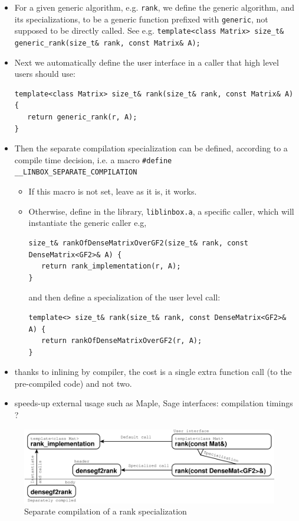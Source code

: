 \documentclass[runningheads,a4paper]{llncs}
\begin{document}
\begin{itemize}
\item For a given generic algorithm, e.g. \verb!rank!, we define the
  generic algorithm, and its specializations, to be a generic function
  prefixed with \verb!generic!, not supposed to be directly called. See e.g. 
\verb!template<class Matrix> size_t& generic_rank(size_t& rank, const Matrix& A);!
\item Next we automatically define the user interface in a caller that
  high level users should use:
\begin{verbatim}
template<class Matrix> size_t& rank(size_t& rank, const Matrix& A) {
   return generic_rank(r, A);
}
\end{verbatim}
\item Then the separate compilation specialization can be defined,
  according to a compile time decision, i.e. a macro 
\verb!#define __LINBOX_SEPARATE_COMPILATION!
\begin{itemize}
\item If this macro is not set, leave as it is, it works.
\item Otherwise, define in the library, \verb!liblinbox.a!, 
a specific caller, which will instantiate the generic caller e.g,
\begin{verbatim}
size_t& rankOfDenseMatrixOverGF2(size_t& rank, const DenseMatrix<GF2>& A) {
   return rank_implementation(r, A);
}
\end{verbatim}
and then define a specialization of the user level call:
\begin{verbatim}
template<> size_t& rank(size_t& rank, const DenseMatrix<GF2>& A) {
   return rankOfDenseMatrixOverGF2(r, A);
}
\end{verbatim}
\end{itemize}
\end{itemize}

\begin{itemize}
\item thanks to inlining by compiler, the cost is a single extra
  function call (to the pre-compiled code) and not two.
\item speeds-up external usage such as Maple, Sage interfaces:
  compilation timings ?
\end{itemize}

\begin{figure}[ht]
\includegraphics[width=\textwidth]{separate}
\caption{Separate compilation of a rank specialization}\label{fig:sep}
\end{figure}
\end{document}
